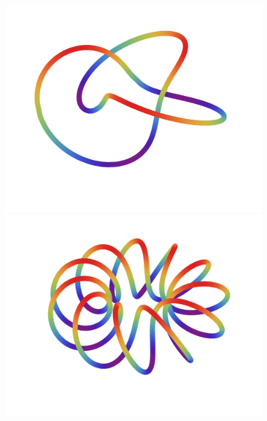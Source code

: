 \begin{figure}[H]
    \begin{minipage}[b]{.3\linewidth}
        \centering
        \includegraphics[width=\linewidth]{../data/torus-p2-q3.pdf}
    \end{minipage}
    \begin{minipage}[b]{.3\linewidth}
        \centering
        \includegraphics[width=\linewidth]{../data/torus-p2-q11.pdf}
    \end{minipage}
    \begin{minipage}[b]{.3\linewidth}

\end{minipage}
\end{figure}
